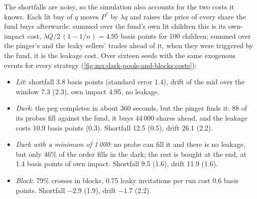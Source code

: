 \label{lst:mx:dark-pools-and-blocks:ping}

The shortfalls are noisy, so the simulation also accounts for the two costs it knows. Each lit buy of $q$ moves $P^\ast$ by $\lambda q$ and raises the
price of every share the fund buys afterwards: summed over the fund's own lit children this is its own-impact cost, $\lambda Q/2\,(1-1/n)=4.95$ basis
points for 100 children; summed over the pinger's and the leaky sellers' trades ahead of it, when they were triggered by the fund, it is the leakage cost.
Over sixteen seeds with the same exogenous events for every strategy (\cref{fig:mx:dark-pools-and-blocks:costs}):

\begin{itemize}
\item \emph{Lit}: shortfall 3.8 basis points (standard error 1.4), drift of the mid over the window 7.3 (2.3), own impact 4.95, no leakage.
\item \emph{Dark}: the peg completes in about 360 seconds, but the pinger finds it: 88 of its probes fill against the fund, it buys 44\,000 shares ahead,
and the leakage costs 10.9 basis points (0.3). Shortfall 12.5 (0.5), drift 26.1 (2.2).
\item \emph{Dark with a minimum of 1\,000}: no probe can fill it and there is no leakage, but only 46\% of the order fills in the dark; the rest is bought
at the end, at 1.4 basis points of own impact. Shortfall 9.5 (1.6), drift 11.9 (1.6).
\item \emph{Block}: 79\% crosses in blocks, 0.75 leaky invitations per run cost 0.6 basis points. Shortfall $-2.9$ (1.9), drift $-1.7$ (2.2).
\end{itemize}

